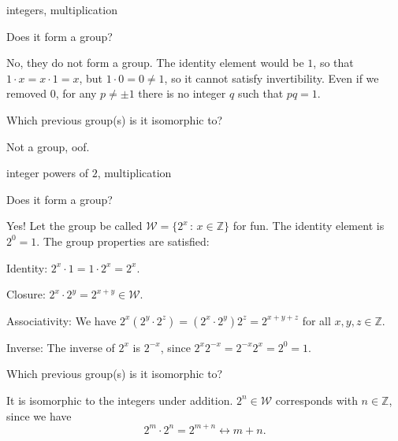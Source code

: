 \documentclass[../key.tex]{subfiles}
\begin{document}
\begin{inner_problem}
\item integers, multiplication
\end{inner_problem}

\begin{iinner_problem}[start=1]
\item Does it form a group?
\end{iinner_problem}

\noindent No, they do not form a group. The identity element would be $1$, so that $1\cdot x = x\cdot 1 = x$, but $1\cdot 0 = 0\neq 1$, so it cannot satisfy invertibility. Even if we removed $0$, for any $p\neq \pm 1$ there is no integer $q$ such that $pq=1$.

\begin{iinner_problem}
\item Which previous group(s) is it isomorphic to?
\end{iinner_problem}

\noindent Not a group, oof.

\begin{inner_problem}
\item integer powers of $2$, multiplication
\end{inner_problem}

\begin{iinner_problem}[start=1]
\item Does it form a group?
\end{iinner_problem}

\noindent Yes! Let the group be called $\mathcal{W}=\{2^x\, :\, x\in \mathbb{Z}\}$ for fun. The identity element is $2^0=1$. The group properties are satisfied:

Identity: $2^x\cdot 1=1\cdot 2^x=2^x$.

Closure: $2^x\cdot 2^y = 2^{x+y} \in \mathcal{W}$.

Associativity: We have $2^{x}(2^{y}\cdot 2^{z})=(2^{x}\cdot 2^{y})2^{z}=2^{x+y+z}$ for all $x,y,z \in \mathbb{Z}$.

Inverse: The inverse of $2^x$ is $2^{-x}$, since $2^{x}2^{-x}=2^{-x}2^{x}=2^0=1$.

\begin{iinner_problem}
\item Which previous group(s) is it isomorphic to?
\end{iinner_problem}

\noindent It is isomorphic to the integers under addition. $2^n\in \mathcal{W}$ corresponds with $n\in \mathbb{Z}$, since we have $$2^m\cdot 2^n=2^{m+n}\leftrightarrow m+n.$$
\end{document}
